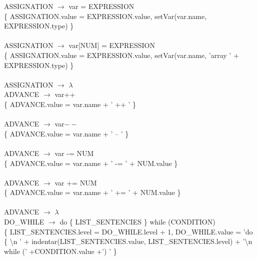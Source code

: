 \documentclass[10pt,a4paper]{article}
\begin{document}
{{{ASSIGNATION $\rightarrow$ var = EXPRESSION \\  

\{ ASSIGNATION.value = EXPRESSION.value, setVar(var.name, EXPRESSION.type) \}  \\ \\

ASSIGNATION $\rightarrow$ var[NUM] = EXPRESSION  \\

\{ ASSIGNATION.value = EXPRESSION.value, setVar(var.name, 'array ' + EXPRESSION.type) \}  \\ \\

ASSIGNATION $\rightarrow$ $\lambda$ \\


ADVANCE $\rightarrow$ var++   \\

\{ ADVANCE.value = var.name + ' ++ ' \}  \\ \\


ADVANCE $\rightarrow$ var$--$   \\

\{ ADVANCE.value = var.name + ' -- ' \}  \\ \\


ADVANCE $\rightarrow$ var -= NUM  \\ 

\{ ADVANCE.value = var.name + ' -= ' + NUM.value \}  \\ \\


ADVANCE $\rightarrow$ var += NUM  \\

\{ ADVANCE.value = var.name + ' += ' + NUM.value \}  \\ \\


ADVANCE $\rightarrow$ $\lambda$ \\

DO\_WHILE $\rightarrow$ do \{ LIST\_SENTENCIES \} while (CONDITION) \\

\{ LIST\_SENTENCIES.level = DO\_WHILE.level + 1, DO\_WHILE.value = 'do \{ \textbackslash{}n ' +  indentar(LIST\_SENTENCIES.value, LIST\_SENTENCIES.level)  + '\textbackslash{}n while (' +CONDITION.value +') ' \} \\ \\



}}}
\end{document}
